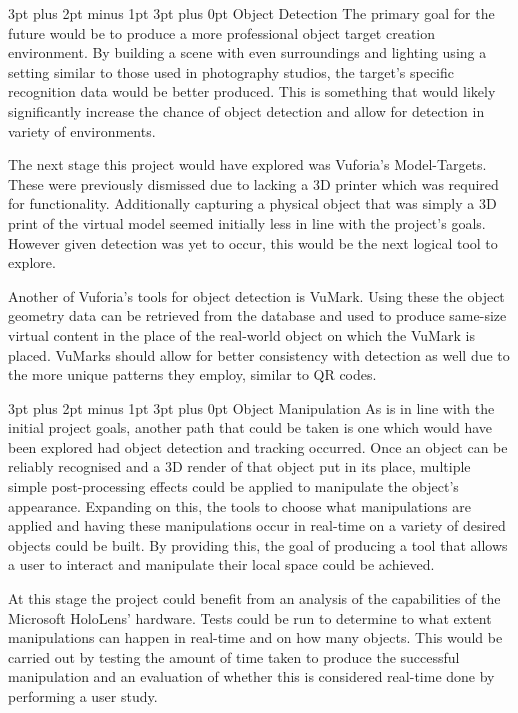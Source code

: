 \documentclass[12pt,a4paper,oneside]{article}
\makeatletter
\renewcommand\subsubsection{\@startsection {subsubsection}{1}{0mm} %
	                           {3pt plus 2pt minus 1pt} %
	                           {3pt plus 0pt} %
	                           {\normalfont\bfseries}}
\makeatother
\begin{document}
\subsubsection{Object Detection}
The primary goal for the future would be to produce a more professional object target creation environment. By building a scene with even surroundings and lighting using a setting similar to those used in photography studios, the target's specific recognition data would be better produced. This is something that would likely significantly increase the chance of object detection and allow for detection in variety of environments.

The next stage this project would have explored was Vuforia's Model-Targets. These were previously dismissed due to lacking a 3D printer which was required for functionality. Additionally capturing a physical object that was simply a 3D print of the virtual model seemed initially less in line with the project's goals. However given detection was yet to occur, this would be the next logical tool to explore. 

Another of Vuforia's tools for object detection is VuMark. Using these the object geometry data can be retrieved from the database and used to produce same-size virtual content in the place of the real-world object on which the VuMark is placed. VuMarks should allow for better consistency with detection as well due to the more unique patterns they employ, similar to QR codes.

\subsubsection{Object Manipulation}
As is in line with the initial project goals, another path that could be taken is one which would have been explored had object detection and tracking occurred. Once an object can be reliably recognised and a 3D render of that object put in its place, multiple simple post-processing effects could be applied to manipulate the object's appearance. Expanding on this, the tools to choose what manipulations are applied and having these manipulations occur in real-time on a variety of desired objects could be built. By providing this, the goal of producing a tool that allows a user to interact and manipulate their local space could be achieved.

At this stage the project could benefit from an analysis of the capabilities of the Microsoft HoloLens' hardware. Tests could be run to determine to what extent manipulations can happen in real-time and on how many objects. This would be carried out by testing the amount of time taken to produce the successful manipulation and an evaluation of whether this is considered real-time done by performing a user study.
\end{document}
